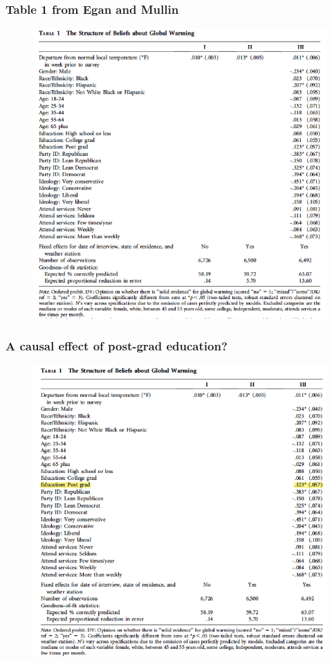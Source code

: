 \documentclass[12pt,english,dvipsnames,aspectratio=169,handout]{beamer}\usepackage[]{graphicx}\usepackage[]{xcolor}
\begin{document}
\begin{frame}
  \frametitle{Table 1 from Egan and Mullin \citeyear{egan_turning_2012}}
	 \begin{figure} 
    \includegraphics[height=.8\textheight]{../04-figures/03/06-egan&mullin_table1}
    \end{figure}
\end{frame}


\begin{frame}
  \frametitle{A causal effect of post-grad education?}
	 \begin{figure} 
    \includegraphics[height=.8\textheight]{../04-figures/03/07-egan&mullin_table1_hl}
    \end{figure}
\end{frame}
\end{document}
